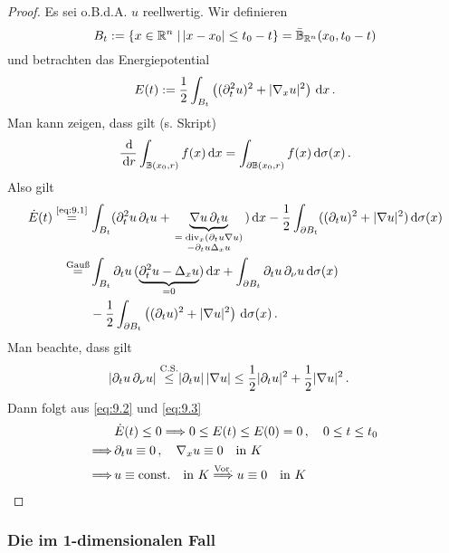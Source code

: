 \begin{proof}
Es sei o.B.d.A. $u$ reellwertig. Wir definieren
\[
	B_t:=\{ x\in\mathbb{R}^n \;\vert\, \lvert x-x_0\rvert \leq t_0 - t\} = \bar{\mathbb{B}}_{\mathbb{R}^n} (x_0,t_0-t) 
\]
und betrachten das Energiepotential
\[
	E(t) := \frac 1 2 \int_{B_t} \left((\partial_t^2 u)^2 + \lvert \nabla_x u\rvert^2\right) \,\mathrm{d} x \, .
\]
Man kann zeigen, dass gilt (s. Skript)
\begin{align}
\label{eq:9.1}
	\frac{\,\mathrm{d}}{\,\mathrm{d} r} \int_{\mathbb{B} (x_0,r)} f(x) \,\mathrm{d} x = \int_{\partial \mathbb{B}(x_0,r)} f(x) \,\mathrm{d} \sigma(x) \, .
\end{align}
Also gilt
\begin{align}\label{eq:9.2}
	\dot E(t) \stackrel{\scriptsize\eqref{eq:9.1}}= \, & \int_{B_t} (\partial_t^2 u \, \partial_t u + \underbrace{\nabla u\,  \partial_t u}_{\scriptsize\parbox{2cm}{\centering$=\div_x (\partial_t u \nabla u)$\\ $-\partial_t u \Delta_x u$}} ) \d x - \frac 1 2 \int_{\partial B_t }((\partial_t u)^2 + \abs{\nabla u}^2) \d \sigma(x) \notag \\
	\stackrel{\scriptsize\text{Gauß}}= & \int_{B_t} \partial_t u \, (\underbrace{\partial_t^2 u - \Delta_x u}_{=0}) \d x + \int_{\partial B_t} \partial_t u\, \partial_\nu u \d \sigma (x) \notag \\ 
	& - \frac 12 \int_{\partial B_t} \left( (\partial_tu)^2+\abs{\nabla u}^2\right) \d \sigma(x) \, .
\end{align}
Man beachte, dass gilt
\begin{align}
\label{eq:9.3}
	\lvert \partial_t u \, \partial_\nu u\rvert \stackrel{\scriptsize\text{C.S.}}\leq & \lvert \partial_t u\rvert\,  \lvert \nabla u\rvert	\leq \frac 12 \lvert \partial_t u\rvert^2 + \frac 12 \lvert \nabla u\rvert^2 \, .
\end{align}
Dann folgt aus \eqref{eq:9.2} und \eqref{eq:9.3}
\begin{align*}
	& \dot E(t) \leq 0 \Longrightarrow 0 \leq E(t) \leq E(0) = 0 \, , \quad 0 \leq t \leq t_0 \\
	\Longrightarrow\,  & \partial_t u \equiv 0 \, , \quad \nabla_xu \equiv 0 \quad \text{in } K  \\
	\Longrightarrow \, & u \equiv \text{const.} \quad \text{in } K \stackrel{\scriptsize\text{Vor.}}{\Longrightarrow} u \equiv 0 \quad \text{in } K \qedhere
\end{align*}
\end{proof}

\subsubsection{Die  im 1-dimensionalen Fall}


